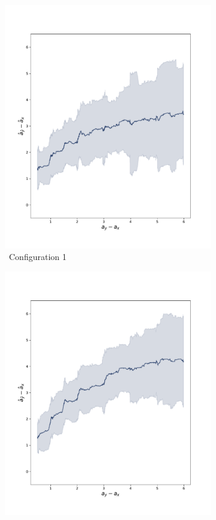 \begin{figure}[h]
	\centering
	\begin{subfigure}{0.48\textwidth}
		\includegraphics[width=\linewidth, trim={30 30 30 30}, clip]{images/age_plots/d_dhat_rolling_config1} 
		\caption{\ Configuration 1}
	\end{subfigure}
	\begin{subfigure}{0.48\textwidth}
		\includegraphics[width=\linewidth, trim={30 30 30 30}, clip]{images/age_plots/d_dhat_rolling_config2} 

\end{subfigure}
\end{figure}
